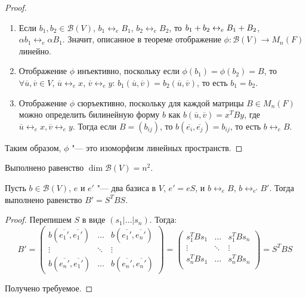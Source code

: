 \begin{proof}~
	\begin{enumerate}
		\item Если $b_1, b_2 \in \mathcal{B}(V)$, $b_1 \leftrightarrow_e B_1$, $b_2 \leftrightarrow_e B_2$, то $b_1 + b_2 \leftrightarrow_e B_1 \hm{+} B_2$, $\alpha b_1 \leftrightarrow_e \alpha B_1$. Значит, описанное в теореме отображение $\phi: \mathcal{B}(V) \rightarrow M_n(F)$ линейно.
		\item Отображение $\phi$ инъективно, поскольку если $\phi(b_1) = \phi(b_2) = B$, то $\forall \overline{u}, \overline{v} \in V$, $\overline{u} \leftrightarrow_e x$, $\overline{v} \leftrightarrow_e y$: $b_1(\overline{u}, \overline{v}) = b_2(\overline{u}, \overline{v})$, то есть $b_1 = b_2$.
		\item Отображение $\phi$ сюръективно, поскольку для каждой матрицы $B \in M_n(F)$ можно определить билинейную форму $b$ как $b(\overline{u}, \overline{v}) = x^TBy$, где $\overline{u} \leftrightarrow_e x, \overline{v} \leftrightarrow_e y$. Тогда если $B = (b_{ij})$, то $b(\overline{e_i}, \overline{e_j}) = b_{ij}$, то есть $b \leftrightarrow_e B$.
	\end{enumerate}
	
	Таким образом, $\phi$ "--- это изоморфизм линейных пространств.
\end{proof}

\begin{corollary}
	Выполнено равенство $\dim{\mathcal{B}(V)} = n^2$.
\end{corollary}

\begin{theorem}
	Пусть $b \in \mathcal{B}(V)$, $e$ и $e'$ "--- два базиса в $V$, $e' = eS$, и $b \leftrightarrow_e B$, $b \leftrightarrow_{e'} B'$. Тогда выполнено равенство $B' = S^TBS$.
\end{theorem}

\begin{proof}
	Перепишем $S$ в виде $(s_1|\dots|s_n)$. Тогда:
	\[B' = \begin{pmatrix}
		b(\overline{e_1'}, \overline{e_1'})&\dots&b(\overline{e_1'}, \overline{e_n'})\\
		\vdots&\ddots&\vdots\\
		b(\overline{e_n'}, \overline{e_1'})&\dots&b(\overline{e_n'}, \overline{e_n'})
	\end{pmatrix} = \begin{pmatrix}
		s_1^TBs_1&\dots&s_1^TBs_n\\
		\vdots&\ddots&\vdots\\
		s_n^TBs_1&\dots&s_n^TBs_n\\
	\end{pmatrix} = S^TBS\]
	
	Получено требуемое.
\end{proof}

